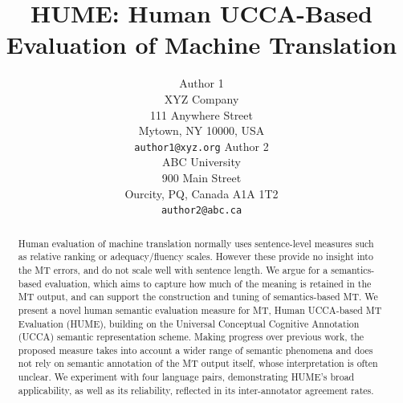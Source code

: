 \documentclass[11pt]{article}
\title{HUME: Human UCCA-Based Evaluation of Machine Translation}
\author{Author 1\\
	    XYZ Company\\
	    111 Anywhere Street\\
	    Mytown, NY 10000, USA\\
	    {\tt author1@xyz.org}
	  \And
	Author 2\\
  	ABC University\\
  	900 Main Street\\
  	Ourcity, PQ, Canada A1A 1T2\\
  {\tt author2@abc.ca}}
\date{}
\begin{document}
\maketitle

\begin{abstract}
  

Human evaluation of machine translation normally uses sentence-level measures such as relative ranking
or adequacy/fluency scales. However these provide no insight into the MT errors,
 and do not scale well with sentence 
length. We argue for a semantics-based evaluation, which aims to capture how much of the meaning
is retained in the MT output, and can support the construction and tuning of semantics-based MT. 
We present a novel human semantic evaluation measure for MT, Human
UCCA-based MT Evaluation (HUME), building on the Universal Conceptual Cognitive Annotation (UCCA) semantic representation scheme.
Making progress over previous work, the proposed measure takes into account
a wider range of semantic phenomena and does not rely on semantic annotation
of the MT output itself, whose interpretation is often unclear.
We experiment with four language pairs, demonstrating HUME's broad applicability,
as well as its reliability, reflected in its inter-annotator agreement rates.



\end{abstract}
\end{document}
